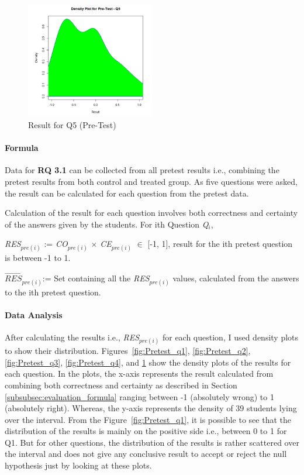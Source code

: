 \begin{figure}
	\centering
	\includegraphics[width=0.5\textwidth]{figures/Pretest_q5}
	\caption{Result for Q5 (Pre-Test)}
	\label{fig:Pretest_q5}
\end{figure}

\paragraph{Formula} Data for \textbf{RQ 3.1} can be collected from all pretest results i.e., combining the pretest results from both control and treated group. As five questions were asked, the result can be calculated for each question from the pretest data. 

Calculation of the result for each question involves both correctness and certainty of the answers given by the students. For ith Question \textit{Q$_{i}$},

\textit{RES$_{pre(i)}$} := \textit{CO$_{pre(i)}$} $\times$ \textit{CE$_{pre(i)}$} $\in$ [-1,  1], result for the ith pretest question is between -1 to 1.

$\overrightarrow{\textit{RES}}$\textit{$_{pre(i)}$}:= Set containing all the \textit{RES$_{pre(i)}$} values, calculated from the answers to the ith pretest question.

\paragraph{Data Analysis}
After calculating the results i.e., \textit{RES$_{pre(i)}$} for each question, I used density plots to show their distribution. Figures~\ref{fig:Pretest_q1}, \ref{fig:Pretest_q2}, \ref{fig:Pretest_q3}, \ref{fig:Pretest_q4}, and \ref{fig:Pretest_q5} show the density plots of the results for each question. In the plots, the x-axis represents the result calculated from combining both correctness and certainty as described in Section \ref{subsubsec:evaluation_formula} ranging between -1 (absolutely wrong) to 1 (absolutely right). Whereas, the y-axis represents the density of 39 students lying over the interval. From the Figure~\ref{fig:Pretest_q1}, it is possible to see that the distribution of the results is mainly on the positive side i.e., between 0 to 1 for Q1. But for other questions, the distribution of the results is rather scattered over the interval and does not give any conclusive result to accept or reject the null hypothesis just by looking at these plots.

